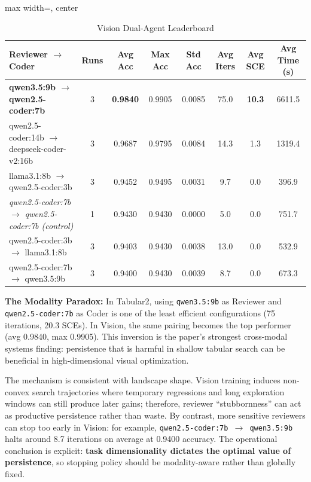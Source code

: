 \documentclass[11pt,a4paper]{article}
\begin{document}
\begin{table}[ht]
\centering
\footnotesize
\setlength{\tabcolsep}{3pt}
\caption{Vision Dual-Agent Leaderboard}
\label{tab:vision_dual}
\begin{adjustbox}{max width=\textwidth, center}
\begin{tabular}{>{\raggedright\arraybackslash}p{4.2cm}ccccccc}
\toprule
\textbf{Reviewer $\rightarrow$ Coder} & \textbf{Runs} & \textbf{Avg Acc} & \textbf{Max Acc} & \textbf{Std Acc} & \textbf{Avg Iters} & \textbf{Avg SCE} & \textbf{Avg Time (s)} \\
\midrule
\textbf{qwen3.5:9b $\rightarrow$ qwen2.5-coder:7b} & 3 & \textbf{0.9840} & 0.9905 & 0.0085 & 75.0 & \textbf{10.3} & 6611.5 \\
qwen2.5-coder:14b $\rightarrow$ deepseek-coder-v2:16b & 3 & 0.9687 & 0.9795 & 0.0084 & 14.3 & 1.3 & 1319.4 \\
llama3.1:8b $\rightarrow$ qwen2.5-coder:3b & 3 & 0.9452 & 0.9495 & 0.0031 & 9.7 & 0.0 & 396.9 \\
\midrule
\textit{qwen2.5-coder:7b $\rightarrow$ qwen2.5-coder:7b (control)} & 1 & 0.9430 & 0.9430 & 0.0000 & 5.0 & 0.0 & 751.7 \\
\midrule
qwen2.5-coder:3b $\rightarrow$ llama3.1:8b & 3 & 0.9403 & 0.9430 & 0.0038 & 13.0 & 0.0 & 532.9 \\
qwen2.5-coder:7b $\rightarrow$ qwen3.5:9b & 3 & 0.9400 & 0.9430 & 0.0039 & 8.7 & 0.0 & 673.3 \\
\bottomrule
\end{tabular}
\end{adjustbox}
\end{table}

\textbf{The Modality Paradox:} In Tabular2, using \texttt{qwen3.5:9b} as Reviewer and \texttt{qwen2.5-\allowbreak coder:7b} as Coder is one of the least efficient configurations (75 iterations, 20.3 SCEs). In Vision, the same pairing becomes the top performer (avg 0.9840, max 0.9905). This inversion is the paper's strongest cross-modal systems finding: persistence that is harmful in shallow tabular search can be beneficial in high-dimensional visual optimization.

The mechanism is consistent with landscape shape. Vision training induces non-convex search trajectories where temporary regressions and long exploration windows can still produce later gains; therefore, reviewer ``stubbornness'' can act as productive persistence rather than waste. By contrast, more sensitive reviewers can stop too early in Vision: for example, \texttt{qwen2.5-coder:7b $\rightarrow$ qwen3.5:9b} halts around 8.7 iterations on average at 0.9400 accuracy. The operational conclusion is explicit: \textbf{task dimensionality dictates the optimal value of persistence}, so stopping policy should be modality-aware rather than globally fixed.
\end{document}

